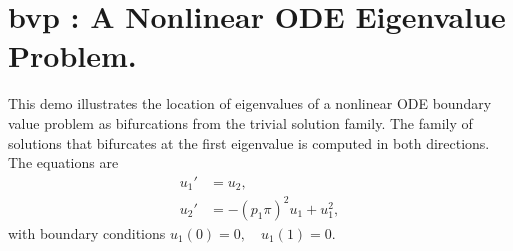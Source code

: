 \documentclass[12pt]{report}
\begin{document}
\newpage
\section{ bvp : A Nonlinear ODE Eigenvalue Problem.} \label{sec:Demos_bvp}
This demo illustrates the location of eigenvalues of a nonlinear ODE
boundary value problem as bifurcations from the trivial solution family.
The family of solutions that bifurcates at the first eigenvalue
is computed in both directions.
The equations are
\begin{equation} \begin{array}{cl}
 u_1 ' &= u_2  ,  \\
  u_2 ' &=-(p_1 \pi)^{2}u_1 + u_1^{2} ,\end{array} \end{equation}
with boundary conditions $ u_1(0)=0 ,  \quad  u_1(1)=0.$~~~
\end{document}
